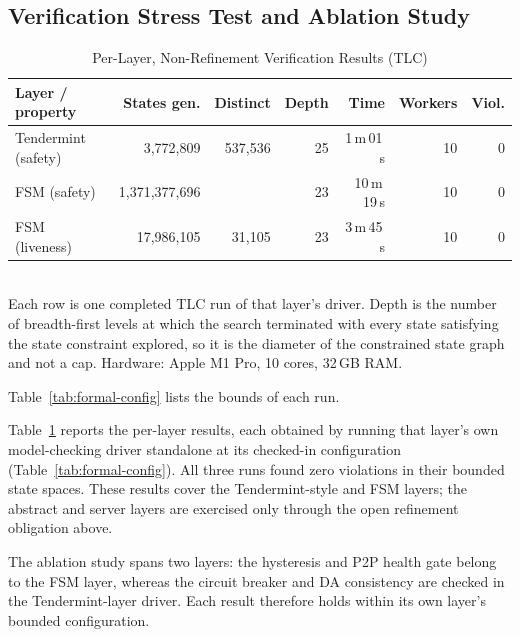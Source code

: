 \subsection{Verification Stress Test and Ablation Study}

\begin{table}[h]
\caption{Per-Layer, Non-Refinement Verification Results (TLC)}
\label{tab:formal-verification}
\centering
\footnotesize
\begin{tabular}{@{}lrrrrrr@{}}
\toprule
\textbf{Layer / property} & \textbf{States gen.} & \textbf{Distinct} & \textbf{Depth} & \textbf{Time} & \textbf{Workers} & \textbf{Viol.} \\
\midrule
Tendermint (safety) & 3{,}772{,}809 & 537{,}536 & 25 & 1\,m\,01\,s & 10 & 0 \\
FSM (safety) & 1{,}371{,}377{,}696 & \resFSMStatesExact{} & 23 & 10\,m\,19\,s & 10 & 0 \\
FSM (liveness) & 17{,}986{,}105 & 31{,}105 & 23 & 3\,m\,45\,s & 10 & 0 \\
\bottomrule
\end{tabular}
\\[2pt]
\footnotesize Each row is one completed TLC run of that layer's driver. Depth is
the number of breadth-first levels at which the search terminated with every
state satisfying the state constraint explored, so it is the diameter of the
constrained state graph and not a cap. Hardware: Apple M1 Pro, 10 cores, 32\,GB RAM.
\end{table}

Table~\ref{tab:formal-config} lists the bounds of each run.

Table~\ref{tab:formal-verification} reports the per-layer results, each
obtained by running that layer's own model-checking driver standalone at its
checked-in configuration (Table~\ref{tab:formal-config}). All three runs
found zero violations in their bounded state spaces. These results cover
the Tendermint-style and FSM layers; the abstract and server layers are
exercised only through the open refinement obligation above.

The ablation study spans two layers: the hysteresis and P2P health gate
belong to the FSM layer, whereas the circuit breaker and DA consistency are
checked in the Tendermint-layer driver. Each result therefore holds within its
own layer's bounded configuration.

